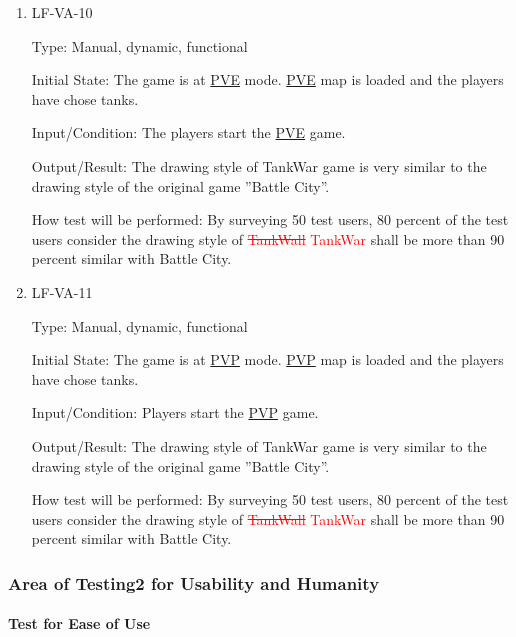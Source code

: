 \documentclass[12pt, titlepage]{article}
\begin{document}
\begin{enumerate}
\item{LF-VA-10\\}

Type: Manual, dynamic, functional
					
Initial State: The game is at \underline{PVE} mode. \underline{PVE} map is loaded and the players have chose tanks.
					
Input/Condition: The players start the \underline{PVE} game. 
					
Output/Result: The drawing style of TankWar game is very similar to the drawing style of the original game ”Battle City”.
					
How test will be performed: By surveying 50 test users, 80 percent of the test users consider the drawing style of \textcolor{red}{\sout{TankWall} TankWar} shall be more than 90 percent similar with Battle City.

\item{LF-VA-11\\}

Type: Manual, dynamic, functional
					
Initial State: The game is at \underline{PVP} mode. \underline{PVP} map is loaded and the players have chose tanks.
					
Input/Condition: Players start the \underline{PVP} game. 
					
Output/Result: The drawing style of TankWar game is very similar to the drawing style of the original game ”Battle City”.
					
How test will be performed: By surveying 50 test users, 80 percent of the test users consider the drawing style of \textcolor{red}{\sout{TankWall} TankWar} shall be more than 90 percent similar with Battle City.

\end{enumerate}



\subsubsection{Area of Testing2 for Usability and Humanity}
\paragraph{Test for Ease of Use}
\end{document}
